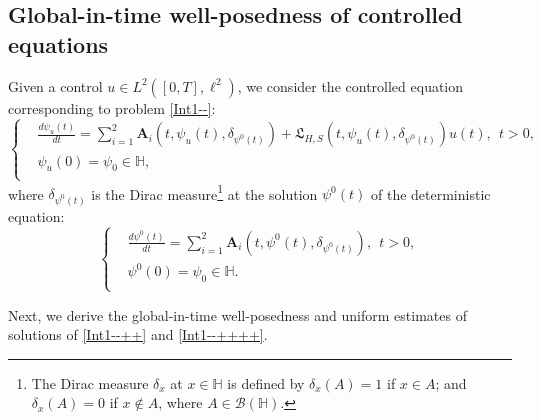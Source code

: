 \documentclass[11pt]{article}
\numberwithin{equation}{section}
\begin{document}
\subsection{Global-in-time well-posedness of   controlled equations}
Given a control
$u\in L^2([0,T],\ell^2)$, we consider the
 controlled equation corresponding to problem  \eqref{Int1--}:
\begin{equation}\label{Int1--++}
\left\{
  \begin{aligned}
  &\frac{d \psi_u(t)}{dt}
=\sum_{i=1}^2\textbf{A}_i(t,\psi_u(t),\delta_{\psi^0(t)})
+ \mathfrak{L}_{H,S}(t,\psi_u(t),
\delta_{\psi^0(t)})u(t), \ \ t>0, \\
  &\psi_u(0)=\psi_0\in \mathbb{H},\\
  \end{aligned}
\right.
\end{equation}
where $\delta_{\psi^0(t)}$ is the Dirac measure\footnote{The Dirac
 measure $\delta_{x}$ at $x\in \mathbb{H}$ is defined by $\delta_{x}(A)=1$ if $x\in A$; and $\delta_{x}(A)=0$ if $x\notin A$, where $A\in \mathcal{B}(\mathbb{H})$.} at
 the solution $\psi^0(t)$ of the
 deterministic  equation:
\begin{equation}\label{Int1--++++}
\left\{
  \begin{aligned}
  &\frac{d \psi^0(t)}{dt}
=\sum_{i=1}^2\textbf{A}_i(t,\psi^0(t),\delta_{\psi^0(t)})
, \ \ t>0, \\
  &\psi^0(0)=\psi_0\in \mathbb{H}.\\
  \end{aligned}
\right.
\end{equation}

Next, we derive the global-in-time well-posedness and uniform estimates of solutions of \eqref{Int1--++} and \eqref{Int1--++++}.
\end{document}
